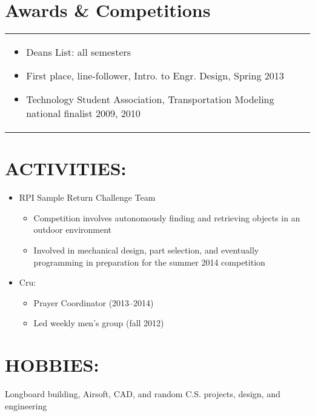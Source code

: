 \documentclass[margin]{res}
\begin{document}
\begin{resume}
\normalsize{\section{Awards \& Competitions}}
\begin{tabular}{p{4in} r}
\begin{itemize}
\item Deans List: all semesters
\item First place, line-follower, Intro. to Engr. Design, Spring 2013
\item Technology Student Association, Transportation Modeling national finalist 2009, 2010
\end{itemize}
\end{tabular}	
\vspace{-1.5mm}

\section{ACTIVITIES:}
	\begin{itemize}
    \item RPI Sample Return Challenge Team
    \begin{itemize}
      \item Competition involves autonomously finding and retrieving objects in an outdoor environment
      \item Involved in mechanical design, part selection, and eventually programming in preparation for the summer 2014 competition
    \end{itemize}
   	\item Cru:
    \begin{itemize}
      \item Prayer Coordinator (2013--2014)
      \item Led weekly men's group (fall 2012)
    \end{itemize}
	\end{itemize}
\vspace{-5mm}

\normalsize\section{HOBBIES:}
	Longboard building, Airsoft, CAD, and random C.S. projects, design, and engineering

\end{resume} 
\end{document}
